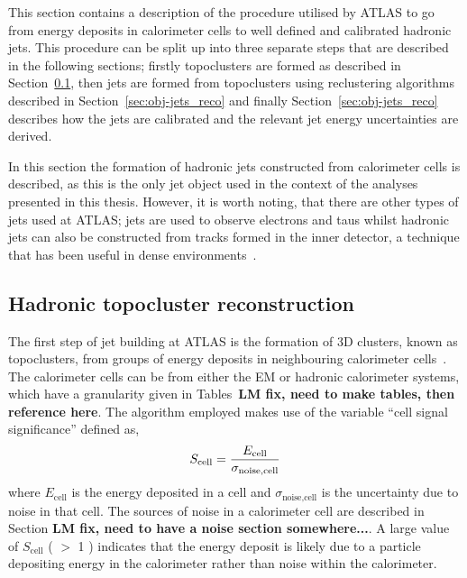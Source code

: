 This section contains a description of the procedure utilised by ATLAS
to go from energy deposits in calorimeter cells to well defined and calibrated hadronic jets.
This procedure can be split up into three separate steps that are described in the following sections;
firstly topoclusters are formed as described in Section~\ref{sec:obj-jets_topo},
then jets are formed from topoclusters using reclustering algorithms described in Section~\ref{sec:obj-jets_reco}
and finally Section~\ref{sec:obj-jets_reco} describes how the jets are calibrated and the relevant jet energy uncertainties are derived.

In this section the formation of hadronic jets constructed from calorimeter cells is described,
as this is the only jet object used in the context of the analyses presented in this thesis.
However, it is worth noting, that there are other types of jets used at ATLAS;
jets are used to observe electrons and taus whilst
hadronic jets can also be constructed from tracks formed in the inner detector, a technique that has been useful in dense environments~\cite{obj-Hbb}.

\subsection{Hadronic topocluster reconstruction}
\label{sec:obj-jets_topo}

The first step of jet building at ATLAS is the formation of 3D clusters, known as topoclusters, from groups of energy deposits in neighbouring calorimeter cells~\cite{obj-jets_topo}.
The calorimeter cells can be from either the EM or hadronic calorimeter systems,
which have a granularity given in Tables~\textbf{LM fix, need to make tables, then reference here}.
The algorithm employed makes use of the variable ``cell signal significance'' defined as, 
\begin{equation}
  \Large{S_{\text{cell}} = \frac{E_{\text{cell}}}{\sigma_{\text{noise,cell}}}}
\end{equation}
where $E_{\text{cell}}$ is the energy deposited in a cell
and $\sigma_{\text{noise,cell}}$ is the uncertainty due to noise in that cell.
The sources of noise in a calorimeter cell are described in Section \textbf{LM fix, need to have a noise section somewhere...}.
A large value of $S_{\text{cell}}$ ( $>$ 1 ) indicates that the energy deposit is likely due to a particle
depositing energy in the calorimeter rather than noise within the calorimeter.

